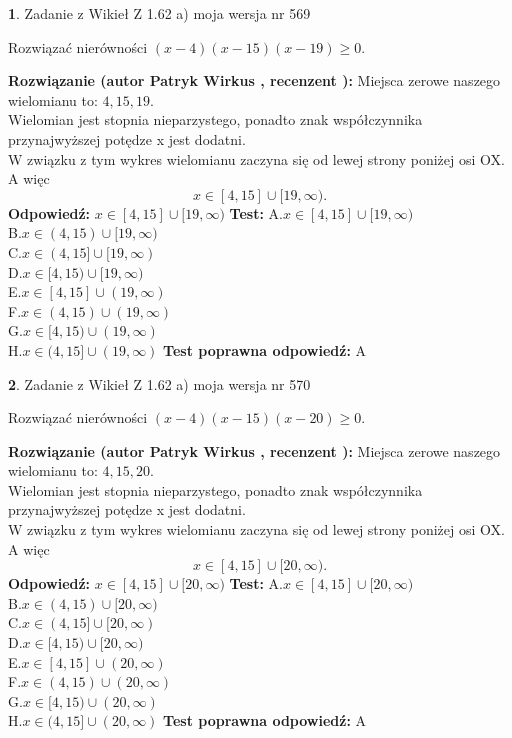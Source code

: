 \documentclass[12pt, a4paper]{article}
\theoremstyle{definition} %
\newtheorem{zad}{}
\newcommand{\zadStart}[1]{\begin{zad}#1\newline}
\newcommand{\zadStop}{\end{zad}}
\newcommand{\rozwStart}[2]{\noindent \textbf{Rozwiązanie (autor #1 , recenzent #2): }\newline}
\newcommand{\rozwStop}{\newline}
\newcommand{\odpStart}{\noindent \textbf{Odpowiedź:}\newline}
\newcommand{\odpStop}{\newline}
\newcommand{\testStart}{\noindent \textbf{Test:}\newline}
\newcommand{\testStop}{\newline}
\newcommand{\kluczStart}{\noindent \textbf{Test poprawna odpowiedź:}\newline}
\newcommand{\kluczStop}{\newline}
\begin{document}
\zadStart{Zadanie z Wikieł Z 1.62 a) moja wersja nr 569}

Rozwiązać nierówności $(x-4)(x-15)(x-19)\ge0$.
\zadStop
\rozwStart{Patryk Wirkus}{}
Miejsca zerowe naszego wielomianu to: $4, 15, 19$.\\
Wielomian jest stopnia nieparzystego, ponadto znak współczynnika przy\linebreak najwyższej potędze x jest dodatni.\\ W związku z tym wykres wielomianu zaczyna się od lewej strony poniżej osi OX. A więc $$x \in [4,15] \cup [19,\infty).$$
\rozwStop
\odpStart
$x \in [4,15] \cup [19,\infty)$
\odpStop
\testStart
A.$x \in [4,15] \cup [19,\infty)$\\
B.$x \in (4,15) \cup [19,\infty)$\\
C.$x \in (4,15] \cup [19,\infty)$\\
D.$x \in [4,15) \cup [19,\infty)$\\
E.$x \in [4,15] \cup (19,\infty)$\\
F.$x \in (4,15) \cup (19,\infty)$\\
G.$x \in [4,15) \cup (19,\infty)$\\
H.$x \in (4,15] \cup (19,\infty)$
\testStop
\kluczStart
A
\kluczStop



\zadStart{Zadanie z Wikieł Z 1.62 a) moja wersja nr 570}

Rozwiązać nierówności $(x-4)(x-15)(x-20)\ge0$.
\zadStop
\rozwStart{Patryk Wirkus}{}
Miejsca zerowe naszego wielomianu to: $4, 15, 20$.\\
Wielomian jest stopnia nieparzystego, ponadto znak współczynnika przy\linebreak najwyższej potędze x jest dodatni.\\ W związku z tym wykres wielomianu zaczyna się od lewej strony poniżej osi OX. A więc $$x \in [4,15] \cup [20,\infty).$$
\rozwStop
\odpStart
$x \in [4,15] \cup [20,\infty)$
\odpStop
\testStart
A.$x \in [4,15] \cup [20,\infty)$\\
B.$x \in (4,15) \cup [20,\infty)$\\
C.$x \in (4,15] \cup [20,\infty)$\\
D.$x \in [4,15) \cup [20,\infty)$\\
E.$x \in [4,15] \cup (20,\infty)$\\
F.$x \in (4,15) \cup (20,\infty)$\\
G.$x \in [4,15) \cup (20,\infty)$\\
H.$x \in (4,15] \cup (20,\infty)$
\testStop
\kluczStart
A
\kluczStop
\end{document}
